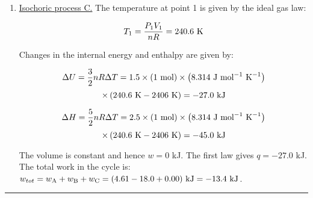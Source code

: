 \begin{enumerate}
\item \underline{Isochoric process C.} The temperature at point 1 is given by the ideal gas law:

$$T_1 = \frac{P_1V_1}{nR} = 240.6\textnormal{ K}$$

Changes in the internal energy and enthalpy are given by:

$$\Delta U = \frac{3}{2}nR\Delta T = 1.5\times \left(1\textnormal{ mol}\right) \times \left( 8.314\textnormal{ J mol}^{-1}\textnormal{ K}^{-1}\right)$$
$$\times\left(240.6\textnormal{ K} - 2406\textnormal{ K}\right) = -27.0\textnormal{ kJ}$$

$$\Delta H = \frac{5}{2}nR\Delta T = 2.5\times \left(1\textnormal{ mol}\right) \times \left( 8.314\textnormal{ J mol}^{-1}\textnormal{ K}^{-1}\right)$$
$$\times\left(240.6\textnormal{ K} - 2406\textnormal{ K}\right) = -45.0\textnormal{ kJ}$$

The volume is constant and hence $w = 0$ kJ. The first law gives $q = -27.0$ kJ. The total work in the cycle is: $w_{tot} = w_{\textnormal{A}} + w_{\textnormal{B}} + w_{\textnormal{C}} = (4.61 - 18.0 + 0.00)\textnormal{ kJ} = -13.4\textnormal{ kJ}$.

\end{enumerate}

\hrule\vspace{0.5cm}
